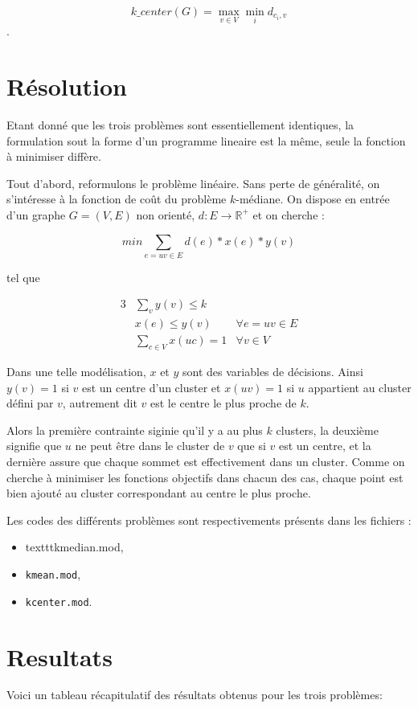 \documentclass[12pt,a4paper]{article}
\begin{document}
\[ k\_center(G) = \max_{v \in V} \min_i d_{c_i,v} \].

\section*{Résolution}
Etant donné que les trois problèmes sont essentiellement identiques, la formulation sout la forme d'un programme lineaire est la même, seule la fonction à minimiser diffère.

Tout d'abord, reformulons le problème linéaire. Sans perte de généralité, on s'intéresse à la fonction de coût du problème $k$-médiane. On dispose en entrée d'un graphe $G = (V,E)$ non orienté, $d: E \rightarrow \mathbb{R}^+$ et on cherche :

\[ min \sum_{e = uv \in E} d(e) * x(e) * y(v) \]

tel que

\begin{alignat}{3}
& \sum_{v} y(v) \leq k & \\
& x(e) \leq y(v) & \forall e = uv \in E  \\
& \sum_{c \in V} x(uc) = 1 & \forall v \in V
\end{alignat}


Dans une telle modélisation, $x$ et $y$ sont des variables de décisions. Ainsi $y(v) = 1$ si $v$ est un centre d'un cluster et $x(uv) =1$ si $u$ appartient au cluster défini par $v$, autrement dit $v$ est le centre le plus proche de $k$.

Alors la première contrainte siginie qu'il y a au plus $k$ clusters, la deuxième signifie que $u$ ne peut être dans le cluster de $v$ que si $v$ est un centre, et la dernière assure que chaque sommet est effectivement dans un cluster. Comme on cherche à minimiser les fonctions objectifs dans chacun des cas, chaque point est bien ajouté au cluster correspondant au centre le plus proche.

Les codes des différents problèmes sont respectivements présents dans les fichiers :
\begin{itemize}
\item texttt{kmedian.mod}, 
\item \texttt{kmean.mod},
\item \texttt{kcenter.mod}.
\end{itemize}

\section*{Resultats}
Voici un tableau récapitulatif des résultats obtenus pour les trois problèmes:
\end{document}
